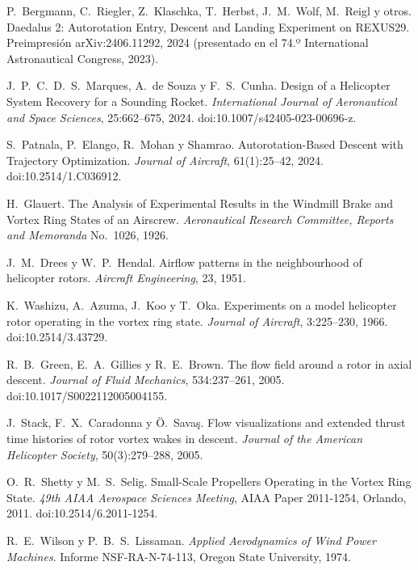  P.~Bergmann, C.~Riegler, Z.~Klaschka, T.~Herbst,
  J.~M.~Wolf, M.~Reigl y otros. Daedalus 2: Autorotation Entry, Descent and Landing
  Experiment on REXUS29. Preimpresión arXiv:2406.11292, 2024 (presentado en el 74.º
  International Astronautical Congress, 2023).

 J.~P.~C.~D.~S.~Marques, A.~de Souza y F.~S.~Cunha. Design of
  a Helicopter System Recovery for a Sounding Rocket. \emph{International Journal of
  Aeronautical and Space Sciences}, 25:662--675, 2024. doi:10.1007/s42405-023-00696-z.

 S.~Patnala, P.~Elango, R.~Mohan y Shamrao.
  Autorotation-Based Descent with Trajectory Optimization. \emph{Journal of Aircraft},
  61(1):25--42, 2024. doi:10.2514/1.C036912.

 H.~Glauert. The Analysis of Experimental Results in the
  Windmill Brake and Vortex Ring States of an Airscrew. \emph{Aeronautical Research
  Committee, Reports and Memoranda} No.~1026, 1926.

 J.~M.~Drees y W.~P.~Hendal. Airflow patterns in the
  neighbourhood of helicopter rotors. \emph{Aircraft Engineering}, 23, 1951.

 K.~Washizu, A.~Azuma, J.~Koo y T.~Oka. Experiments on a
  model helicopter rotor operating in the vortex ring state. \emph{Journal of Aircraft},
  3:225--230, 1966. doi:10.2514/3.43729.

 R.~B.~Green, E.~A.~Gillies y R.~E.~Brown. The flow field
  around a rotor in axial descent. \emph{Journal of Fluid Mechanics}, 534:237--261, 2005.
  doi:10.1017/S0022112005004155.

 J.~Stack, F.~X.~Caradonna y Ö.~Savaş. Flow visualizations
  and extended thrust time histories of rotor vortex wakes in descent. \emph{Journal of
  the American Helicopter Society}, 50(3):279--288, 2005.

 O.~R.~Shetty y M.~S.~Selig. Small-Scale Propellers
  Operating in the Vortex Ring State. \emph{49th AIAA Aerospace Sciences Meeting}, AIAA
  Paper 2011-1254, Orlando, 2011. doi:10.2514/6.2011-1254.

 R.~E.~Wilson y P.~B.~S.~Lissaman. \emph{Applied
  Aerodynamics of Wind Power Machines}. Informe NSF-RA-N-74-113, Oregon State University,
  1974.

